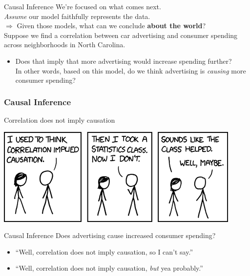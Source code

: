 \documentclass[11pt]{beamer}
\begin{document}
\begin{frame}[c]{Causal Inference}
  We're focused on what comes \alert{next}.\\
\pause \emph{Assume} our model faithfully represents the data. \\
\pause $\Rightarrow$ \alert{Given those models, what can we conclude \textbf{about the world}?} \\
\vspace*{0.3cm}
\pause Suppose we find a correlation between car advertising and consumer spending across neighborhoods in North Carolina.
\begin{itemize}
  \pause \item Does that imply that more advertising would increase spending further? \\
  \pause In other words, based on this model, do we think advertising is \emph{causing} more consumer spending?
\end{itemize}
\end{frame}

\begin{frame}[c]
  \frametitle{Causal Inference}
\centering
Correlation does not imply causation
\end{frame}

\begin{frame}[c]
  \centering
  \includegraphics[width=\textwidth]{xkcd_correlation_causation.png}
\end{frame}

\begin{frame}[c]{Causal Inference}
Does advertising cause increased consumer spending?
  \begin{itemize}
  \pause \item ``Well, correlation does not imply causation, so I can't say.''
  \pause \item ``Well, correlation does not imply causation, \emph{but} yea probably.''
\end{itemize}
\end{frame}
\end{document}
